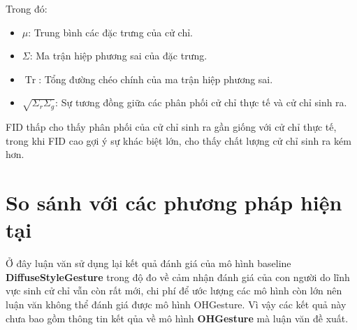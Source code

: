 Trong đó:

\begin{itemize}
	\item $\mu$: Trung bình các đặc trưng của cử chỉ.
	\item $\Sigma$: Ma trận hiệp phương sai của đặc trưng.
	\item $\operatorname{Tr}$: Tổng đường chéo chính của ma trận hiệp phương sai.
	\item $\sqrt{\Sigma_r \Sigma_g}$: Sự tương đồng giữa các phân phối cử chỉ thực tế và cử chỉ sinh ra.
\end{itemize}

FID thấp cho thấy phân phối của cử chỉ sinh ra gần giống với cử chỉ thực tế, trong khi FID cao gợi ý sự khác biệt lớn, cho thấy chất lượng cử chỉ sinh ra kém hơn.





%	







\section{So sánh với các phương pháp hiện tại}
\label{sec:result}


Ở đây luận văn sử dụng lại kết quả đánh giá của mô hình baseline \textbf{DiffuseStyleGesture} \cite{yang2023diffusestylegesture} trong độ đo về  cảm nhận đánh giá của con người do lĩnh vực sinh cử chỉ vẫn còn rất mới, chi phí để ước lượng các mô hình còn lớn nên luận văn không thể đánh giá được mô hình OHGesture. Vì vậy các kết quả này chưa bao gồm thông tin kết qủa về mô hình \textbf{OHGesture} mà luận văn đề xuất.

